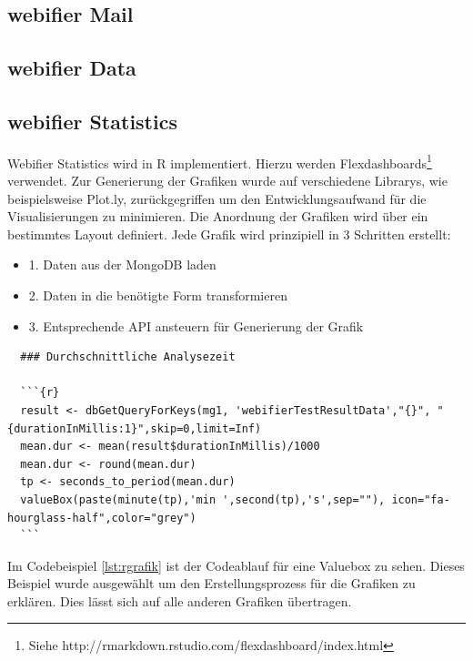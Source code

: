 
\subsection{webifier Mail}


\subsection{webifier Data}


\subsection{webifier Statistics}
Webifier Statistics wird in R implementiert. Hierzu werden Flexdashboards\footnote{Siehe http://rmarkdown.rstudio.com/flexdashboard/index.html} verwendet. Zur Generierung der Grafiken wurde auf verschiedene Librarys, wie beispielsweise Plot.ly, zurückgegriffen um den Entwicklungsaufwand für die Visualisierungen zu minimieren. Die Anordnung der Grafiken wird über ein bestimmtes Layout definiert. Jede Grafik wird prinzipiell in 3 Schritten erstellt:
\begin{itemize}
  \item 1. Daten aus der MongoDB laden
  \item 2. Daten in die benötigte Form transformieren
  \item 3. Entsprechende API ansteuern für Generierung der Grafik
\end{itemize}

\begin{scriptsize}
\begin{lstlisting}
  ### Durchschnittliche Analysezeit

  ```{r}
  result <- dbGetQueryForKeys(mg1, 'webifierTestResultData',"{}", "{durationInMillis:1}",skip=0,limit=Inf)
  mean.dur <- mean(result$durationInMillis)/1000
  mean.dur <- round(mean.dur)
  tp <- seconds_to_period(mean.dur)
  valueBox(paste(minute(tp),'min ',second(tp),'s',sep=""), icon="fa-hourglass-half",color="grey")
  ```
\end{lstlisting}
\end{scriptsize}

Im Codebeispiel \ref{lst:rgrafik} ist der Codeablauf für eine Valuebox zu sehen. Dieses Beispiel wurde ausgewählt um den Erstellungsprozess für die Grafiken zu erklären. Dies lässt sich auf alle anderen Grafiken übertragen.

